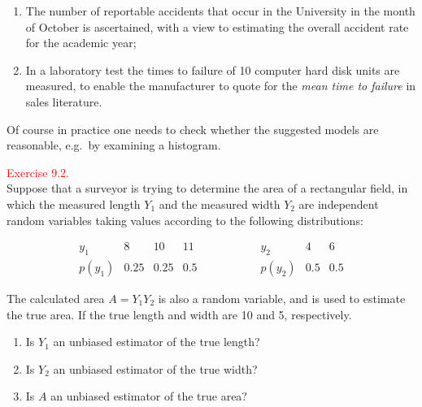 \documentclass[
]{book}
\providecommand{\tightlist}{%
  \setlength{\itemsep}{0pt}\setlength{\parskip}{0pt}}
\begin{document}
\begin{enumerate}
\def\labelenumi{(\alph{enumi})}
\tightlist
\item
  The number of reportable accidents that occur in the University in the month of October is ascertained, with a view to estimating the overall accident rate for the academic year;\\
\item
  In a laboratory test the times to failure of 10 computer hard disk units are measured, to enable the manufacturer to quote for the \emph{mean time to failure} in sales literature.
\end{enumerate}

Of course in practice one needs to check whether the suggested models are reasonable, e.g.~by examining a histogram.

\hfill\break

\hypertarget{exer9:2}{}
\textcolor{red}{Exercise 9.2.}\\
Suppose that a surveyor is trying to determine the area of a rectangular field, in which the measured length \(Y_1\) and the measured width \(Y_2\) are independent random variables taking
values according to the following distributions:

\[ \begin{array}{l|lll}
y_1 & 8 & 10 & 11 \\ \hline
p(y_1) & 0.25 & 0.25 & 0.5
\end{array} \hspace{2cm} \begin{array}{l|ll}
y_2 & 4 & 6 \\ \hline
p(y_2) & 0.5 & 0.5
\end{array} \]

The calculated area \(A = Y_1 Y_2\) is also a random variable, and is used to estimate the true area.
If the true length and width are 10 and 5, respectively.

\begin{enumerate}
\def\labelenumi{(\alph{enumi})}
\tightlist
\item
  Is \(Y_1\) an unbiased estimator of the true length?\\
\item
  Is \(Y_2\) an unbiased estimator of the true width?\\
\item
  Is \(A\) an unbiased estimator of the true area?\\
\end{enumerate}
\end{document}
